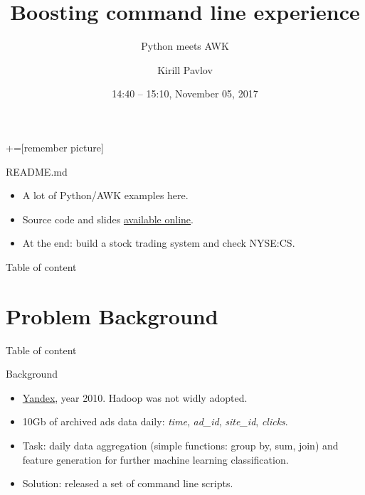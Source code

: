 \documentclass[unicode, notheorems, aspectratio=169]{beamer}
\title[Boosting command line: python + awk]{Boosting command line experience}
\subtitle{Python meets AWK}
\author[Kirill Pavlov <k@p99.io>]{Kirill Pavlov}
\institute[]{Technical Recruiter, Terminal 1}
\date{14:40 -- 15:10, November 05, 2017}
\begin{document}
+=[remember picture]

\everymath{\displaystyle}


\begin{frame}
\titlepage
\end{frame}

\begin{frame}{README.md}
\begin{itemize}
\item A lot of Python/AWK examples here.
\item Source code and slides \href{https://github.com/pavlov99/presentations/tree/master/2017-11-05-pycon}{available online}.
\item At the end: build a stock trading system and check NYSE:CS.
\end{itemize}
\end{frame}

\begin{frame}{Table of content}
    \tableofcontents
\end{frame}

\section{Problem Background}
\begin{frame}{Table of content}
	\tableofcontents[currentsection]
\end{frame}

\begin{frame}{Background}
\begin{itemize}
\item \href{https://yandex.com}{Yandex}, year 2010. Hadoop was not widly adopted.
\item 10Gb of archived ads data daily: \textit{time}, \textit{ad\_id}, \textit{site\_id}, \textit{clicks}.
\item Task: daily data aggregation (simple functions: group by, sum, join) and feature generation for further machine learning classification.
\item Solution: released a set of command line scripts.
\end{itemize}
\end{frame}
\end{document}

